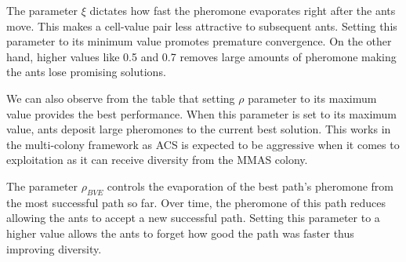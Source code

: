     The parameter $\xi$ dictates how fast the pheromone evaporates right after the ants move. This makes a cell-value pair less attractive to subsequent ants. Setting this parameter to its minimum value promotes premature convergence. On the other hand, higher values like 0.5 and 0.7 removes large amounts of pheromone making the ants lose promising solutions. 

    We can also observe from the table that setting $\rho$ parameter to its maximum value provides the best performance. When this parameter is set to its maximum value, ants deposit large pheromones to the current best solution. This works in the multi-colony framework as ACS is expected to be aggressive when it comes to exploitation as it can receive diversity from the MMAS colony. 

    The parameter $\rho_{BVE}$ controls the evaporation of the best path's pheromone from the most successful path so far. Over time, the pheromone of this path reduces allowing the ants to accept a new successful path. Setting this parameter to a higher value allows the ants to forget how good the path was faster thus improving diversity. 
 

\begin{table}[H]
    \centering
    \caption{Summary of the impact of Timeout values on model performance across $9\times9$, $16\times16$, and $25\times25$ Sudoku Instances.}
    \label{tab:ablation_timeout}
    \footnotesize
\end{table}


